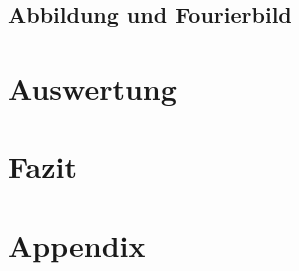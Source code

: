 \documentclass[10pt,a4paper]{article}
\begin{document}
	\subsection{Abbildung und Fourierbild}
	
	
	\newpage
	\clearpage
	
	\section{Auswertung}
	
	
	
	
	
	\section{Fazit} %
	
	
	
	\newpage
	\clearpage
	
	
	
	
	
	\newpage
	\clearpage
	
	
	
	
	
	\newpage
	
	\listoffigures %
	
	\newpage
	\clearpage
	
	\section{Appendix}
	
	
\end{document}
